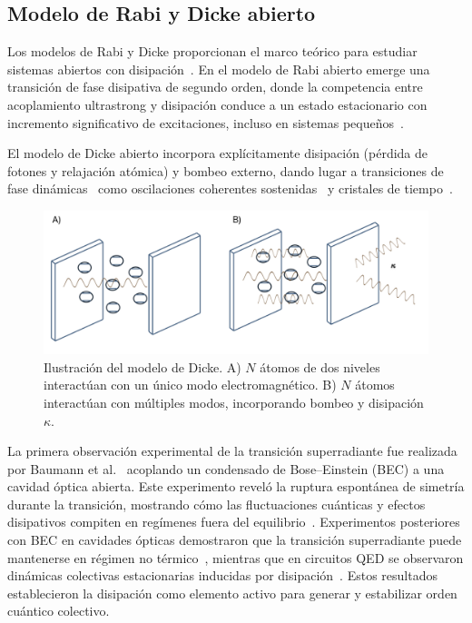 \documentclass[onecolumn,notitlepage,letterpaper,aps,pra,12pt]{article}
\numberwithin{equation}{section}
\begin{document}
\subsection{Modelo de Rabi y Dicke abierto}

Los modelos de Rabi y Dicke proporcionan el marco teórico para estudiar sistemas abiertos con disipación~\cite{henriet2014,hwang2018,zueco2019,Lyu2024,damanet2019,Grimsmo2013}. En el modelo de Rabi abierto emerge una transición de fase disipativa de segundo orden, donde la competencia entre acoplamiento ultrastrong y disipación conduce a un estado estacionario con incremento significativo de excitaciones, incluso en sistemas pequeños~\cite{hwang2018}.

El modelo de Dicke abierto incorpora explícitamente disipación (pérdida de fotones y relajación atómica) y bombeo externo, dando lugar a transiciones de fase dinámicas~\cite{kirton2017,LeBoite2020} como oscilaciones coherentes sostenidas~\cite{mivehvar2021} y cristales de tiempo~\cite{zhu2019}.

\begin{figure}[H]
    \centering
    \includegraphics[width=0.9\linewidth]{Images/cavity1.png}
    \caption{Ilustración del modelo de Dicke. 
A) \( N \) átomos de dos niveles interactúan con un único modo electromagnético. 
B) \( N \) átomos interactúan con múltiples modos, incorporando bombeo y disipación \( \kappa \).}
    \label{Figure Cavity}
\end{figure}

La primera observación experimental de la transición superradiante fue realizada por Baumann et al.~\cite{Baumann11} acoplando un condensado de Bose–Einstein (BEC) a una cavidad óptica abierta. Este experimento reveló la ruptura espontánea de simetría durante la transición, mostrando cómo las fluctuaciones cuánticas y efectos disipativos compiten en regímenes fuera del equilibrio~\cite{Baumann10}. Experimentos posteriores con BEC en cavidades ópticas demostraron que la transición superradiante puede mantenerse en régimen no térmico~\cite{Baumann10,Klinder15}, mientras que en circuitos QED se observaron dinámicas colectivas estacionarias inducidas por disipación~\cite{Blais2021}. Estos resultados establecieron la disipación como elemento activo para generar y estabilizar orden cuántico colectivo.
\end{document}
